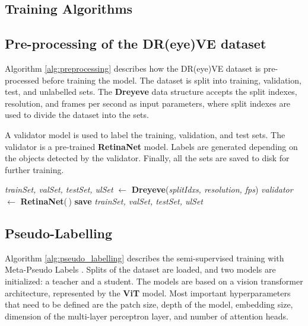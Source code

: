 \begin{appendices}
    \chapter{Training Algorithms}
    \label{appendix:training_algorithms}
    \section{Pre-processing of the DR(eye)VE dataset}
    Algorithm \ref{alg:preprocessing} describes how the DR(eye)VE dataset is 
    pre-processed before training the model. The dataset is split into training, 
    validation, test, and unlabelled sets. The \textbf{Dreyeve} data structure 
    accepts the split indexes, resolution, and frames per second as input parameters, 
    where split indexes are used to divide the dataset into the sets.

    A validator model is used to label the training, validation, and test sets. 
    The validator is a pre-trained \textbf{RetinaNet} model. Labels are generated 
    depending on the objects detected by the validator. Finally, all the sets are 
    saved to disk for further training.
    \begin{algorithm}
        \vspace{0.2cm}
        \DontPrintSemicolon
        \textit{trainSet, valSet, testSet, ulSet} $\gets$ \textbf{Dreyeve}(\textit{splitIdxs, resolution, fps})\;
        \textit{validator} $\gets$ \textbf{RetinaNet}(\,)\;
        \textbf{save} \textit{trainSet, valSet, testSet, ulSet}\;
    \end{algorithm}
    \section{Pseudo-Labelling}
    Algorithm \ref{alg:pseudo_labelling} describes the semi-supervised training 
    with Meta-Pseudo Labels \cite{pham2021meta}.
    Splits of the dataset are loaded, and two models are initialized: a teacher 
    and a student. The models are based on a vision transformer architecture, 
    represented by the \textbf{ViT} model. Most important hyperparameters that 
    need to be defined are the patch size, depth of the model, embedding size, 
    dimension of the multi-layer perceptron layer, and number of attention heads.


\end{appendices}
